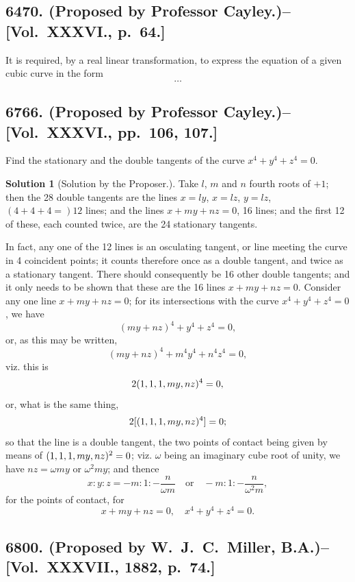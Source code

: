 \documentclass[11pt,a4paper]{article}
\theoremstyle{definition}
\newtheorem*{solution}{Solution}
\begin{document}
\subsection*{6470. (Proposed by Professor Cayley.)\---[Vol.~XXXVI., p.~64.]}

It is required, by a real linear transformation, to express the equation of a given cubic curve in the form
\[
\ldots
\]

\subsection*{6766. (Proposed by Professor Cayley.)\---[Vol.~XXXVI., pp.~106, 107.]}

Find the stationary and the double tangents of the curve $x^4+y^4+z^4=0$.

\begin{solution}[Solution by the Proposer.]
Take $l$, $m$ and $n$ fourth roots of $+1$; then the 28 double tangents are the lines $x=ly$, $x=lz$, $y=lz$, $(4+4+4=)12$ lines; and the lines $x+my+nz=0$, 16 lines; and the first 12 of these, each counted twice, are the 24 stationary tangents.

In fact, any one of the 12 lines is an osculating tangent, or line meeting the curve in 4 coincident points; it counts therefore once as a double tangent, and twice as a stationary tangent. There should consequently be 16 other double tangents; and it only needs to be shown that these are the 16 lines $x+my+nz=0$. Consider any one line $x+my+nz=0$; for its intersections with the curve $x^4+y^4+z^4=0$, we have
\[
(my+nz)^4 + y^4 + z^4 = 0,
\]
or, as this may be written,
\[
(my+nz)^4 + m^4y^4 + n^4z^4 = 0,
\]
viz. this is
\[
2(1,1,1\char`\,my,nz)^4 = 0,
\]
or, what is the same thing,
\[
2[(1,1,1\char`\,my,nz)^4] = 0;
\]
so that the line is a double tangent, the two points of contact being given by means of $(1,1,1\char`\,my,nz)^2 = 0$; viz. $\omega$ being an imaginary cube root of unity, we have $nz = \omega my$ or $\omega^2 my$; and thence
\[
x : y : z = -m : 1 : -\frac{n}{\omega m} \quad\text{or}\quad -m : 1 : -\frac{n}{\omega^2 m},
\]
for the points of contact, for
\[
x+my+nz=0, \quad x^4+y^4+z^4=0.
\]
\end{solution}

\newpage

\subsection*{6800. (Proposed by W.~J.~C.~Miller, B.A.)\---[Vol.~XXXVII., 1882, p.~74.]}
\end{document}

